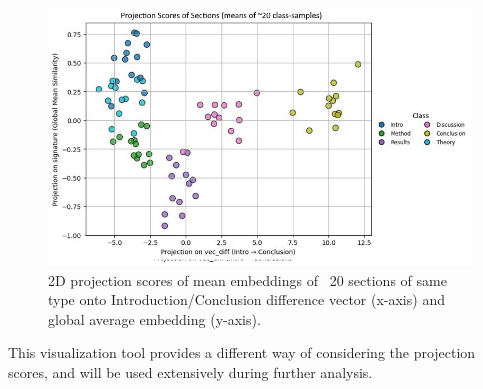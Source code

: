 \begin{figure}%
    \centering
    \includegraphics[width=.8\linewidth]{media/mean_section_projections.png}
    \caption{2D projection scores of mean embeddings of ~20 sections of same type onto Introduction/Conclusion difference vector (x-axis) and global average embedding (y-axis).}
    \label{fig:108}
\end{figure}

This visualization tool provides a different way of considering the projection scores, and will be used extensively during further analysis.